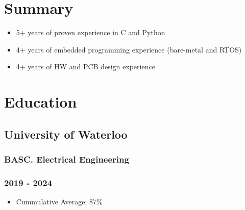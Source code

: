 \documentclass[lighthipster]{styles}
\renewcommand{\normalsize}{\fontsize{10.2}{12}\selectfont}
\begin{document}
\setlength{\columnsep}{1cm}
\begin{paracol}{2}






{
\flushleft

\setlength\columnsep{0.4cm} %

\section*{Summary}
\vspace{0.1cm}

\begin{itemize}
    \item 5+ years of proven experience in C and Python
    \item 4+ years of embedded programming experience (bare-metal and RTOS)
    \item 4+ years of HW and PCB design experience
\end{itemize}

\vspace{0.05cm}

\section*{Education}
\subsection*{University of Waterloo}
\subsubsection*{BASC. Electrical Engineering} \vspace{-0.075cm}
\subsubsection*{\color{ryanGrey}2019 - 2024}
\begin{itemize}
    \item Cummulative Average: 87\%
\end{itemize}

}
\end{paracol}
\end{document}
